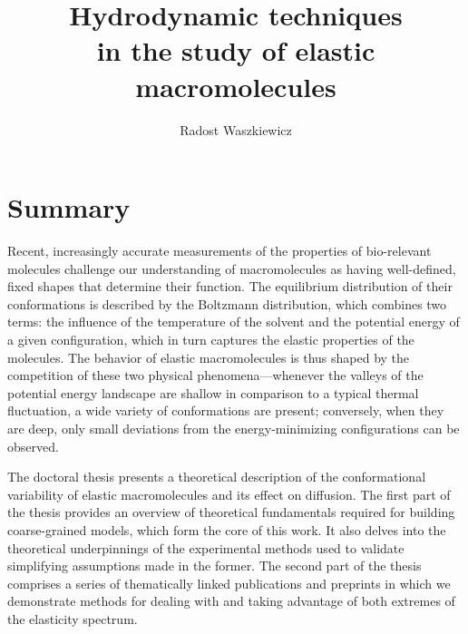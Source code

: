 \documentclass{doctoral}
\title{Hydrodynamic techniques\\in the study of elastic macromolecules}
\author{Radost Waszkiewicz}
\affiliation{University of Warsaw\\Faculty of Physics}
\begin{document}
\maketitle
{}

\section*{Summary}
Recent, increasingly accurate measurements of the properties of bio-relevant molecules challenge our understanding of macromolecules as having well-defined, fixed shapes that determine their function.
The equilibrium distribution of their conformations is described by the Boltzmann distribution, which combines two terms: the influence of the temperature of the solvent and the potential energy of a given configuration, which in turn captures the elastic properties of the molecules.
The behavior of elastic macromolecules is thus shaped by the competition of these two physical phenomena---whenever the valleys of the potential energy landscape are shallow in comparison to a typical thermal fluctuation, a wide variety of conformations are present; conversely, when they are deep, only small deviations from the energy-minimizing configurations can be observed.

The doctoral thesis presents a theoretical description of the conformational variability of elastic macromolecules and its effect on diffusion.
The first part of the thesis provides an overview of theoretical fundamentals required for building coarse-grained models, which form the core of this work.
It also delves into the theoretical underpinnings of the experimental methods used to validate simplifying assumptions made in the former.
The second part of the thesis comprises a series of thematically linked publications and preprints in which we demonstrate methods for dealing with and taking advantage of both extremes of the elasticity spectrum.
\end{document}

